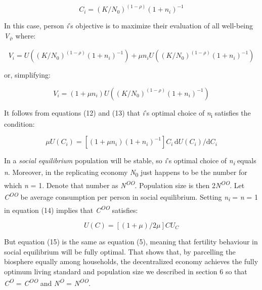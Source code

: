 \documentclass[man,11pt,a4paper,floatsintext]{apa7}
\begin{document}
\begin{equation}
C_i = (K/N_0)^{(1-\rho)}(1+n_i)^{-1}
\tag{12}
\end{equation}

\noindent In this case, person \textit{i}'s objective is to maximize their evaluation of all well-being \textit{V}\textsubscript{\textit{i}}, where:

\begin{equation*}
V_i = U((K/N_0)^{(1-\rho)}(1+n_i)^{-1}) + \mu n_iU((K/N_0)^{(1-\rho)}(1+n_i)^{-1})
\end{equation*}

\noindent or, simplifying:

\begin{equation}
V_i = (1+\mu n_i)U((K/N_0)^{(1-\rho)}(1+n_i)^{-1})
\tag{13}
\end{equation}

\noindent It follows from equations (12) and (13) that \textit{i}'s optimal choice of \textit{n}\textsubscript{i} satisfies the condition:

\begin{equation}
\mu U(C_i) = [(1+\mu n_i)(1+n_i)^{-1}]C_i\,\mathrm{d}U(C_i)/\mathrm{d}C_i
\tag{14}
\end{equation}

In a \textit{social equilibrium} population will be stable, so \textit{i}'s optimal choice of \textit{n}\textsubscript{\textit{i}} equals \textit{n}. Moreover, in the replicating economy \textit{N}\textsubscript{0} just happens to be the number for which \textit{n} = 1. Denote that number as \textit{N}\textsuperscript{\textit{OO}}. Population size is then 2\textit{N}\textsuperscript{\textit{OO}}. Let \textit{C}\textsuperscript{\textit{OO}} be average consumption per person in social equilibrium. Setting \textit{n}\textsubscript{\textit{i}} = \textit{n} = 1 in equation (14) implies that \textit{C}\textsuperscript{\textit{OO}} satisfies:

\begin{equation}
U(C) = [(1+\mu)/2\mu]CU_C
\tag{15}
\end{equation}

\noindent But equation (15) is the same as equation (5), meaning that fertility behaviour in social equilibrium will be fully optimal. That shows that, by parcelling the biosphere equally among households, the decentralized economy achieves the fully optimum living standard and population size we described in section 6 so that \textit{C}\textsuperscript{\textit{O}} = \textit{C}\textsuperscript{\textit{OO}} and \textit{N}\textsuperscript{\textit{O}}\textsuperscript{ }= \textit{N}\textsuperscript{\textit{OO}}.
\end{document}
